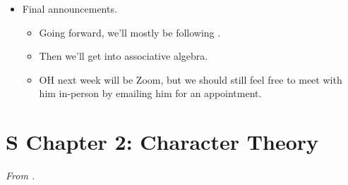 \documentclass[../notes.tex]{subfiles}
\begin{document}
\begin{itemize}
\begin{itemize}
\begin{itemize}
            \item What is going on here??\footnote{See Week 9 OH (Section \ref{sse:OH9}); essentially, we are piggybacking off of a representation of $S_3$ via $\rho:S_4\twoheadrightarrow S_3\xrightarrow{\tilde{\rho}}GL_n$.}
        \end{itemize}
    \end{itemize}
    \item Final announcements.
    \begin{itemize}
        \item Going forward, we'll mostly be following \textcite{bib:FultonHarris}.
        \item Then we'll get into associative algebra.
        \item OH next week will be Zoom, but we should still feel free to meet with him in-person by emailing him for an appointment.
    \end{itemize}
\end{itemize}



\section{S Chapter 2: Character Theory}
\emph{From \textcite{bib:Serre}.}
\end{document}
